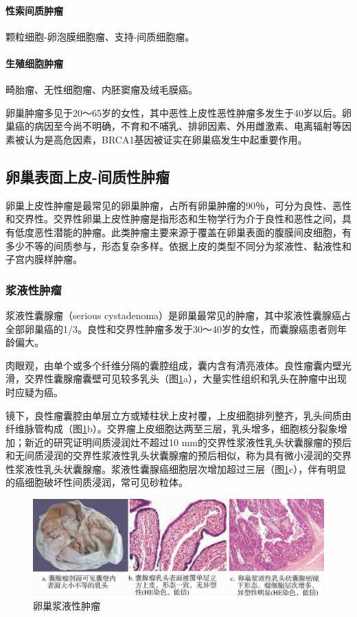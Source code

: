 \paragraph{性索间质肿瘤}
颗粒细胞-卵泡膜细胞瘤、支持-间质细胞瘤。

\paragraph{生殖细胞肿瘤}
畸胎瘤、无性细胞瘤、内胚窦瘤及绒毛膜癌。

卵巢肿瘤多见于20～65岁的女性，其中恶性上皮性恶性肿瘤多发生于40岁以后。卵巢癌的病因至今尚不明确，不育和不哺乳、排卵因素、外用雌激素、电离辐射等因素被认为是高危因素，BRCA1基因被证实在卵巢癌发生中起重要作用。

\subsection{卵巢表面上皮-间质性肿瘤}

卵巢上皮性肿瘤是最常见的卵巢肿瘤，占所有卵巢肿瘤的90％，可分为良性、恶性和交界性。交界性卵巢上皮性肿瘤是指形态和生物学行为介于良性和恶性之间，具有低度恶性潜能的肿瘤。此类肿瘤主要来源于覆盖在卵巢表面的腹膜间皮细胞，有多少不等的间质参与，形态复杂多样。依据上皮的类型不同分为浆液性、黏液性和子宫内膜样肿瘤。

\subsubsection{浆液性肿瘤}

浆液性囊腺瘤（serious
cystadenoma）是卵巢最常见的肿瘤，其中浆液性囊腺癌占全部卵巢癌的1/3。良性和交界性肿瘤多发于30～40岁的女性，而囊腺癌患者则年龄偏大。

肉眼观，由单个或多个纤维分隔的囊腔组成，囊内含有清亮液体。良性瘤囊内壁光滑，交界性囊腺瘤囊壁可见较多乳头（图\ref{fig11-10}a），大量实性组织和乳头在肿瘤中出现时应疑为癌。

镜下，良性瘤囊腔由单层立方或矮柱状上皮衬覆，上皮细胞排列整齐，乳头间质由纤维脉管构成（图\ref{fig11-10}b）。交界瘤上皮细胞达两至三层，乳头增多，细胞核分裂象增加；新近的研究证明间质浸润灶不超过10
mm的交界性浆液性乳头状囊腺瘤的预后和无间质浸润的交界性浆液性乳头状囊腺瘤的预后相似，称为具有微小浸润的交界性浆液性乳头状囊腺瘤。浆液性囊腺癌细胞层次增加超过三层（图\ref{fig11-10}c），伴有明显的癌细胞破坏性间质浸润，常可见砂粒体。

\begin{figure}[!htbp]
 \centering
 \includegraphics{./images/Image00196.jpg}
 \captionsetup{justification=centering}
 \caption{卵巢浆液性肿瘤}
 \label{fig11-10}
  \end{figure} 

